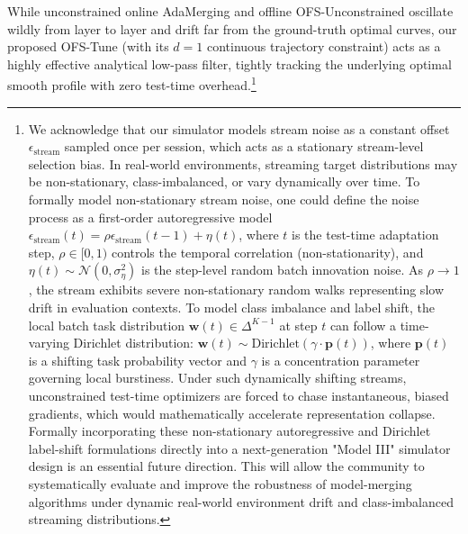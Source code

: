 While unconstrained online AdaMerging and offline OFS-Unconstrained oscillate wildly from layer to layer and drift far from the ground-truth optimal curves, our proposed OFS-Tune (with its $d=1$ continuous trajectory constraint) acts as a highly effective analytical low-pass filter, tightly tracking the underlying optimal smooth profile with zero test-time overhead.\footnote{We acknowledge that our simulator models stream noise as a constant offset $\epsilon_{\text{stream}}$ sampled once per session, which acts as a stationary stream-level selection bias.
In real-world environments, streaming target distributions may be non-stationary, class-imbalanced, or vary dynamically over time.
To formally model non-stationary stream noise, one could define the noise process as a first-order autoregressive model $\epsilon_{\text{stream}}(t) = \rho \epsilon_{\text{stream}}(t-1) + \eta(t)$, where $t$ is the test-time adaptation step, $\rho \in [0, 1)$ controls the temporal correlation (non-stationarity), and $\eta(t) \sim \mathcal{N}(0, \sigma^2_{\eta})$ is the step-level random batch innovation noise.
As $\rho \to 1$, the stream exhibits severe non-stationary random walks representing slow drift in evaluation contexts.
To model class imbalance and label shift, the local batch task distribution $\mathbf{w}(t) \in \Delta^{K-1}$ at step $t$ can follow a time-varying Dirichlet distribution: $\mathbf{w}(t) \sim \text{Dirichlet}(\gamma \cdot \mathbf{p}(t))$, where $\mathbf{p}(t)$ is a shifting task probability vector and $\gamma$ is a concentration parameter governing local burstiness.
Under such dynamically shifting streams, unconstrained test-time optimizers are forced to chase instantaneous, biased gradients, which would mathematically accelerate representation collapse.
Formally incorporating these non-stationary autoregressive and Dirichlet label-shift formulations directly into a next-generation "Model III" simulator design is an essential future direction.
This will allow the community to systematically evaluate and improve the robustness of model-merging algorithms under dynamic real-world environment drift and class-imbalanced streaming distributions.}

